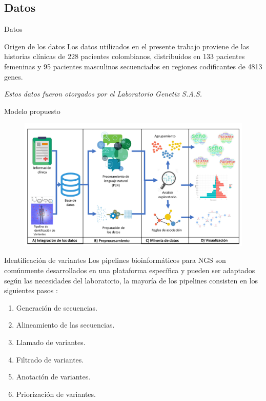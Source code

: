 \documentclass[xcolor=dvipsnames]{beamer}
\begin{document}
\subsection{Datos}

\begin{frame}{Datos}

\begin{block}{Origen de los datos}
	{\justifying 
		Los datos utilizados en el presente trabajo proviene de las historias clínicas de 228 pacientes colombianos, distribuidos en 133 pacientes femeninas y 95 pacientes masculinos secuenciados en regiones codificantes de 4813 genes. 
	}
\end{block}

\textit{Estos datos fueron otorgados por el Laboratorio Genetix S.A.S.}
\end{frame}

\begin{frame}{Modelo propuesto}
\begin{figure}
\includegraphics[width=1\textwidth]{KDDtesis.pdf}
\end{figure}
\end{frame}

\begin{frame}{Identificación de variantes}
	\justifying 
	Los pipelines bioinformáticos para NGS son comúnmente desarrollados en una plataforma específica y pueden ser adaptados según las necesidades del laboratorio, la mayoría de los pipelines consisten en los siguientes pasos \cite{Roy2018}:
	\justifying 
	\begin{enumerate}[1.]
		\justifying
		\item Generación de secuencias.
		\item Alineamiento de las secuencias.
		\item Llamado de variantes.
		\item Filtrado de variantes.
		\item Anotación de variantes.
		\item Priorización de variantes. 
	\end{enumerate}
\end{frame}
\end{document}
